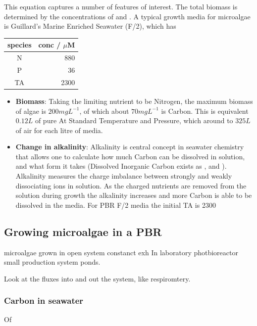 \documentclass{ruthesis}
\begin{document}
This equation captures a number of features of interest.  The total biomass is determined by the concentrations of  and . A typical growth media for microalgae is Guillard's Marine Enriched Seawater (F/2), which has 
 
\begin{table}[h]
\begin{tabular}{ |c|r|}
\textbf{species} & \textbf{conc} / $\mu$M \\
\hline
N  &   880 \\
P   &   36  \\
TA & 2300
\end{tabular}
\end{table}

\begin{itemize}
\item{\textbf{Biomass}:} Taking the limiting nutrient to be Nitrogen, the maximum biomass of algae is $200 mg L^{-1}$, of which about $70 mg L^{-1}$ is Carbon.  This is equivalent  $0.12 L$ of pure  At Standard Temperature and Pressure, which around to $325 L$ of air for each litre of media.

\item{\textbf{Change in alkalinity}:} Alkalinity is central concept in seawater chemistry that allows one to calculate how much Carbon can be dissolved in solution, and what form it takes (Dissolved Inorganic Carbon exists as ,  and ).  Alkalinity measures the charge imbalance between strongly and weakly dissociating ions in solution.  As the charged nutrients are removed from the solution during growth the alkalinity increases and more Carbon is able to be dissolved in the media.  For PBR F/2 media the initial TA is  2300 
\end{itemize}

\subsection{Growing microalgae in a PBR}
microalgae grown in open system constanct exh In laboratory photbioreactor small production system ponds.  



Look at the fluxes into and out the system, like respiromtery.


\subsubsection{Carbon in seawater}
 Of
 
\end{document}
